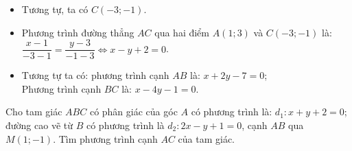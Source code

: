 \begin{bt}
{\begin{itemize}
			Đường thẳng $A'B$ qua điểm $A'(1;-1)$ và song song với đường thẳng $d_1$ nên nhận véc-tơ $\vec{CG}=(2;1)$ làm véc-tơ chỉ phương.\\
			Phương trình đường thẳng $A'B$ là: $\dfrac{x-1}{2}=\dfrac{y+1}{1}\Leftrightarrow x-2y-3=0$.\\
			Điểm $B=A'B\cap d_2$, tọa độ điểm $B$ là nghiệm hệ: $\begin{cases}
			x-2y-3&=0\\
			y-1&=0
			\end{cases}\Rightarrow B(5;1)$.
			\item Tương tự, ta có $C(-3;-1)$.
			\item Phương trình đường thẳng $AC$ qua hai điểm $A(1;3)$ và $C(-3;-1)$ là:\\
			$\dfrac{x-1}{-3-1}=\dfrac{y-3}{-1-3}\Leftrightarrow x-y+2=0$.
			\item Tương tự ta có: phương trình cạnh $AB$ là: $x+2y-7=0$;\\
			Phương trình cạnh $BC$ là: $x-4y-1=0$.
		\end{itemize}	
	}
\end{bt}



\begin{bt}%
	Cho tam giác $ABC$ có phân giác của góc $A$ có phương trình là: $d_1\colon x+y+2=0$; đường cao vẽ từ $B$ có phương trình là $d_2\colon 2x-y+1=0$, cạnh $AB$ qua $M(1;-1)$. Tìm phương trình cạnh $AC$ của tam giác.
\end{bt}

